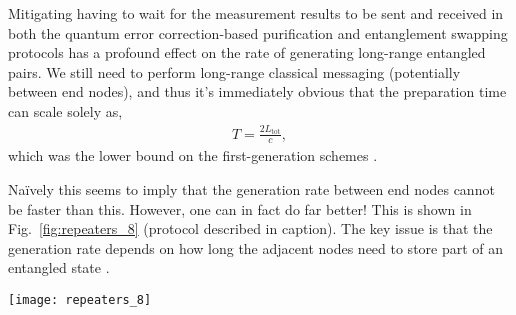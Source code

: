 Mitigating having to wait for the measurement results to be sent and received in both the quantum error correction-based purification and entanglement swapping protocols has a profound effect on the rate of generating long-range entangled pairs. We still need to perform long-range classical messaging (potentially between end nodes), and thus it's immediately obvious that the preparation time can scale solely as,
\begin{align}
	T = \frac{2 L_\mathrm{tot}}{c},
\end{align}
which was the lower bound on the first-generation schemes \cite{bib:munro10}.

Na{\" i}vely this seems to imply that the generation rate between end nodes cannot be faster than this. However, one can in fact do far better! This is shown in Fig.~\ref{fig:repeaters_8} (protocol described in caption). The key issue is that the generation rate depends on how long the adjacent nodes need to store part of an entangled state \cite{bib:jiang09, bib:munro10, bib:Muralidharan2016}. 

\begin{figure*}[!htbp]
\texttt{[image: repeaters\_8]}
\captionspacefig \caption{A butterfly design quantum repeater network protocol that reduces the requirements on all the quantum memory times to only that associated with the signalling time between adjacent repeater nodes \cite{bib:munro10}. Enough pairs must be generated between the node to ensure that we can use them in the error correction code in a single round trip time between adjacent nodes. The scheme relies on multiple entangled pairs being generated temporally, starting from the mid point of the network. The protocol begins with the central node creating links to both the left and right nearest neighbour nodes in sufficient number to allow an error correction code to be implemented. Once they are created the error correction circuits are applied to the links left and right of this central node (effectively creating encoded logical links). Entanglement swapping at the middle node is then applied  between these logical links, creating a logical link between the left and right adjacent nodes. The left and right nodes can then do the same to their next adjacent repeater nodes, error correcting as they go, until the desired end-to-end entangled link is achieved.}
\label{fig:repeaters_8}
\end{figure*} 


